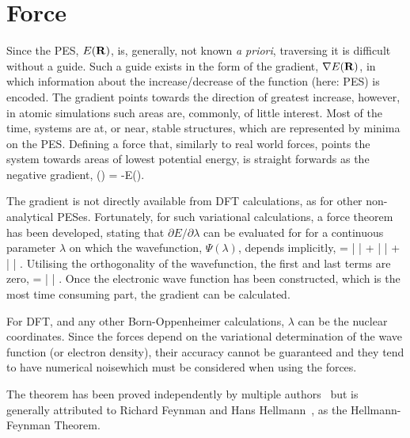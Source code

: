\section{Force}
\label{sec:force}
Since the PES, $E({\mathrm{\mathbf{\bm{R}}}})$, is, generally, not known \textit{a priori}, traversing it is difficult without a guide.
Such a guide exists in the form of the gradient, $\nabla E({\mathrm{\mathbf{\bm{R}}}})$, in which information about the increase/decrease of the function (here: PES) is encoded.
The gradient points towards the direction of greatest increase, however, in atomic simulations such areas are, commonly, of little interest.
Most of the time, systems are at, or near, stable structures, which are represented by minima on the PES.
Defining a force that, similarly to real world forces, points the system towards areas of lowest potential energy, is straight forwards as the negative gradient,
\vF(\vR) = -\nabla E(\vR).
\eeq

The gradient is not directly available from DFT calculations, as for other non-analytical PESes.
Fortunately, for such variational calculations, a force theorem has been developed, stating that $\partial E / \partial\lambda$ can be evaluated for for a continuous parameter $\lambda$ on which the wavefunction, $\Psi(\lambda)$, depends implicitly,
 = 
\bra \frac{\partial \Psi}{\partial \lambda} |  | \Psi \ket +
\bra \Psi |  | \Psi \ket +
\bra \Psi |  | \frac{\partial \Psi}{\partial \lambda} \ket.
\eeq
Utilising the orthogonality of the wavefunction, the first and last terms are zero, 
 = \bra \Psi |  | \Psi \ket.
\eeq
Once the electronic wave function has been constructed, which is the most time consuming part, the gradient can be calculated.

For DFT, and any other Born-Oppenheimer calculations, $\lambda$ can be the nuclear coordinates. 
Since the forces depend on the variational determination of the wave function (or electron density), their accuracy cannot be guaranteed and they tend to have numerical noise\citemiss which must be considered when using the forces.

The theorem has been proved independently by multiple authors~\cite{forces-pauli-1933, forces-guttinger-1932} but is generally attributed to Richard Feynman\cite{forces-feynman-1939} and Hans Hellmann~\cite{forces-hellmann-1937}, as the Hellmann-Feynman Theorem.
